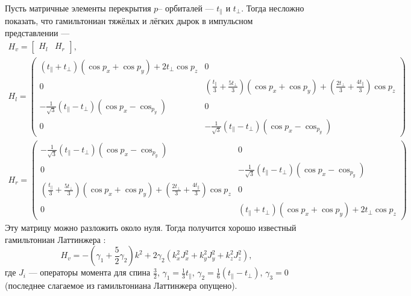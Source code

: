 Пусть матричные элементы перекрытия $p$-- орбиталей --- $t_\parallel$ и $t_\perp$. Тогда
несложно показать, что гамильтониан тяжёлых и лёгких дырок в импульсном представлении ---
\begin{equation}
    \begin{gathered}
    H_v = \begin{bmatrix}
            H_l & H_r
        \end{bmatrix},\\
    H_l = 
    \begin{pmatrix}
        (t_\parallel + t_\perp)(\cos{p_x} + \cos{p_y}) + 2t_\perp \cos{p_z} & 0 \\
        0 & \left(\frac{t_\parallel}{3} + \frac{5t_\perp}{3}\right)(\cos{p_x}+\cos{p_y})+ 
                           \left(\frac{2t_\perp}{3} + \frac{4t_\parallel}{3}\right)\cos{p_z} \\
        -\frac{1}{\sqrt{3}}(t_\parallel - t_\perp)(\cos{p_x} - \cos_{p_y}) & 0 \\
        0 & -\frac{1}{\sqrt{3}}(t_\parallel - t_\perp)(\cos{p_x} - \cos_{p_y}) 
    \end{pmatrix}\\
    H_r = 
    \begin{pmatrix}
        -\frac{1}{\sqrt{3}}(t_\parallel - t_\perp)(\cos{p_x} - \cos_{p_y}) & 0 \\
        0 & -\frac{1}{\sqrt{3}}(t_\parallel - t_\perp)(\cos{p_x} - \cos_{p_y})\\
       \left(\frac{t_\parallel}{3} + \frac{5t_\perp}{3}\right)(\cos{p_x} + \cos{p_y}) + 
                    \left(\frac{2t_\perp}{3} + \frac{4t_\parallel}{3}\right)\cos{p_z} & 0 \\
        0 & (t_\parallel + t_\perp)(\cos{p_x} + \cos{p_y}) + 2t_\perp \cos{p_z}
    \end{pmatrix}
    \end{gathered}
\end{equation}
Эту матрицу можно разложить около нуля. Тогда получится хорошо известный 
гамильтониан Латтинжера \cite{Luttinger1956}:
\begin{equation}
    H_v = -\left(\gamma_1 + \frac{5}{2}\gamma_2\right) k^2 + 
        2\gamma_2(k_x^2J_x^2 + k_y^2J_y^2 + k_z^2J_z^2),
\end{equation}
где $J_i$ --- операторы момента для спина $\frac{3}{2}$, $\gamma_1 = \frac13 t_\parallel$,
$\gamma_2 = \frac16(t_\parallel - t_\perp)$, $\gamma_3 = 0$ (последнее слагаемое 
из гамильтониана Латтинжера опущено).

